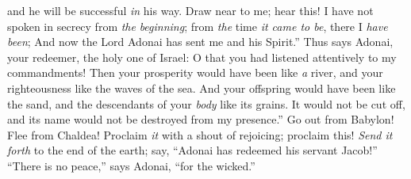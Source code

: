 \begin{biblechapter}
and he will be successful \textit{in} his way.
\verse Draw near to me; hear this! I have not spoken in secrecy from \textit{the} \textit{beginning}; 
from \textit{the} time \textit{it came to be}, there I \textit{have been}; 
And now the Lord Adonai has sent me and his Spirit.”
\verse Thus says Adonai, your redeemer, the holy one of Israel:
\verse O that you had listened attentively to my commandments!
\verse Then your prosperity would have been like \textit{a} river, 
and your righteousness like the waves of the sea.
\verse And your offspring would have been like the sand, 
and the descendants of your \textit{body} like its grains. 
It would not be cut off, 
and its name would not be destroyed from my presence.”
\verse Go out from Babylon! 
Flee from Chaldea! 
Proclaim \textit{it} with a shout of rejoicing; proclaim this! 
\textit{Send it forth} to the end of the earth; 
say, “Adonai has redeemed his servant Jacob!”
\verse “There is no peace,” says Adonai, “for the wicked.”
\end{biblechapter}

